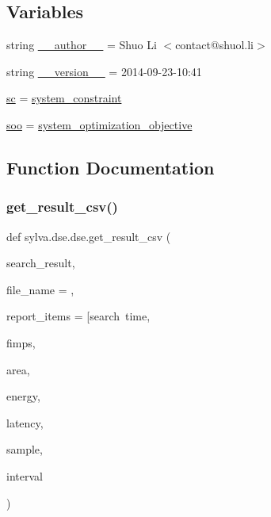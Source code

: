 \subsection*{Variables}
\begin{DoxyCompactItemize}
\item 
string \hyperlink{namespacesylva_1_1dse_1_1dse_ae75d8649b8c58b165513c61e2c9e62c7}{\+\_\+\+\_\+author\+\_\+\+\_\+} = \textquotesingle{}Shuo Li $<$contact@shuol.\+li$>$\textquotesingle{}
\item 
string \hyperlink{namespacesylva_1_1dse_1_1dse_a9c1f8ee252b6dc4cc07384ac848d62cf}{\+\_\+\+\_\+version\+\_\+\+\_\+} = \textquotesingle{}2014-\/09-\/23-\/10\+:41\textquotesingle{}
\item 
\hyperlink{namespacesylva_1_1dse_1_1dse_ac2d9fdcc3f7fd0bad1900fa0a813dff4}{sc} = \hyperlink{classsylva_1_1dse_1_1dse_1_1system__constraint}{system\+\_\+constraint}
\item 
\hyperlink{namespacesylva_1_1dse_1_1dse_ab54fbae03bc2c432fecd4486e623af71}{soo} = \hyperlink{classsylva_1_1dse_1_1dse_1_1system__optimization__objective}{system\+\_\+optimization\+\_\+objective}
\end{DoxyCompactItemize}


\subsection{Function Documentation}
\mbox{\label{namespacesylva_1_1dse_1_1dse_ad3bf704cf280b975ad41bb205bfdc565}} 
\subsubsection{\texorpdfstring{get\+\_\+result\+\_\+csv()}{get\_result\_csv()}}
{\footnotesize\ttfamily def sylva.\+dse.\+dse.\+get\+\_\+result\+\_\+csv (\begin{DoxyParamCaption}\item[{}]{search\+\_\+result,  }\item[{}]{file\+\_\+name = {\ttfamily \textquotesingle{}\textquotesingle{}},  }\item[{}]{report\+\_\+items = {\ttfamily \mbox{[}\textquotesingle{}search~time\textquotesingle{}},  }\item[{}]{fimps,  }\item[{}]{area,  }\item[{}]{energy,  }\item[{}]{latency,  }\item[{}]{sample,  }\item[{}]{interval }\end{DoxyParamCaption})}



